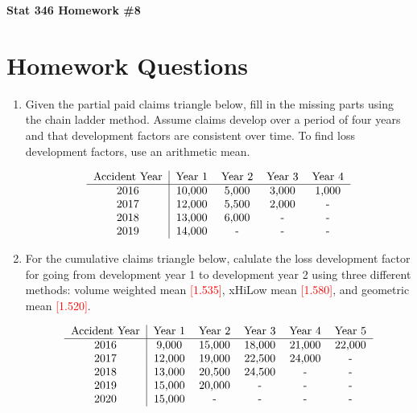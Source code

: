 \documentclass{article}
\begin{document}
\begin{center}
\textbf{Stat 346 Homework \#8}\\
\vspace{0.3in}
\end{center}

\section*{Homework Questions}

\begin{enumerate}
   \item Given the partial paid claims triangle below, fill in the missing parts using the chain ladder method. Assume claims develop over a period of four years and that development factors are consistent over time. To find loss development factors, use an arithmetic mean. 

\[
\begin{tabular}{c|cccc}
Accident Year & Year 1 & Year 2 & Year 3 & Year 4 \\
\hline
2016 & 10,000 & 5,000 & 3,000 & 1,000 \\
2017 & 12,000 & 5,500 & 2,000 & - \\
2018 & 13,000 & 6,000 & - & - \\
2019 & 14,000 & - & - & - \\
\end{tabular}
\]
   
       \item For the cumulative claims triangle below, calulate the loss development factor for going from development year 1 to development year 2 using three different methods: volume weighted mean \textcolor{red}{[1.535]}, xHiLow mean  \textcolor{red}{[1.580]}, and geometric mean  \textcolor{red}{[1.520]}.
    
    \[
    \begin{tabular}{c|ccccc}
    Accident Year & Year 1 & Year 2 & Year 3 & Year 4 & Year 5\\
    \hline
    2016 & 9,000 & 15,000 & 18,000 & 21,000  & 22,000 \\
    2017 & 12,000 & 19,000 & 22,500 & 24,000 & - \\
    2018 & 13,000 & 20,500 & 24,500 & - & - \\
    2019 & 15,000 & 20,000 & - & - & - \\
    2020 & 15,000 & - & - & - & - \\
    \end{tabular}
    \]
    

\end{enumerate}
\end{document}
